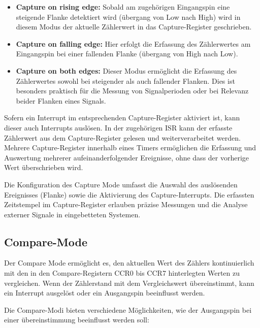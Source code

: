\begin{itemize}
	\item \textbf{Capture on rising edge:} Sobald am zugeh\"origen Eingangspin eine steigende Flanke detektiert wird (\"ubergang von Low nach High) wird in diesem Modus der aktuelle Z\"ahlerwert in das Capture-Register geschrieben.

	\item \textbf{Capture on falling edge:} Hier erfolgt die Erfassung des Z\"ahlerwertes am Eingangspin bei einer fallenden Flanke (\"ubergang von High nach Low).

	\item \textbf{Capture on both edges:} Dieser Modus erm\"oglicht die Erfassung des Z\"ahlerwertes sowohl bei steigender als auch fallender Flanken. Dies ist besonders praktisch f\"ur die Messung von Signalperioden oder bei Relevanz beider Flanken eines Signals.
\end{itemize}

Sofern ein Interrupt im entsprechenden Capture-Register aktiviert ist, kann dieser auch Interrupts ausl\"osen. In der zugeh\"origen ISR kann der erfasste Z\"ahlerwert aus dem Capture-Register gelesen und weiterverarbeitet werden. Mehrere Capture-Register innerhalb eines Timers erm\"oglichen die Erfassung und Auswertung mehrerer aufeinanderfolgender Ereignisse, ohne dass der vorherige Wert \"uberschrieben wird. 

Die Konfiguration des Capture Mode umfasst die Auswahl des ausl\"osenden Ereignisses (Flanke) sowie \ggf die Aktivierung des Capture-Interrupts. Die erfassten Zeitstempel im Capture-Register erlauben pr\"azise Messungen und die Analyse externer Signale in eingebetteten Systemen. 

\subsection{Compare-Mode}
\label{sec:Timer_CompareMode}

Der Compare Mode erm\"oglicht es, den aktuellen Wert des Z\"ahlers kontinuierlich mit den in den Compare-Registern CCR0 bis CCR7 hinterlegten Werten zu vergleichen. Wenn der Z\"ahlerstand mit dem Vergleichswert \"ubereinstimmt, kann \zB ein Interrupt ausgel\"ost oder ein Ausgangspin beeinflusst werden.

Die Compare-Modi bieten verschiedene M\"oglichkeiten, wie der Ausgangspin bei einer \"ubereinstimmung beeinflusst werden soll:

